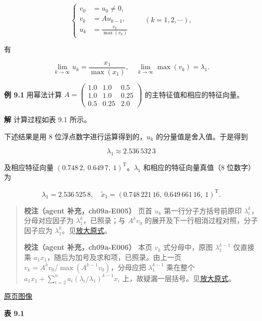 \documentclass[
  10pt,
  fontset=fandol]{ctexart}
\begin{document}
\[
\left\{
\begin{aligned}
v_0&=u_0\ne0,\\
v_k&=Au_{k-1},\\
u_k&=\frac{v_k}{\max(v_k)}
\end{aligned}
\right.\qquad(k=1,2,\cdots),
\tag{9.2.9}
\]

有

\[
\lim_{k\to\infty}u_k=\frac{x_1}{\max(x_1)},\quad\lim_{k\to\infty}\max(v_k)=\lambda_1.
\]

\textbf{例 9.1} 用幂法计算 \(A=\begin{pmatrix}1.0&1.0&0.5\\1.0&1.0&0.25\\0.5&0.25&2.0\end{pmatrix}\) 的主特征值和相应的特征向量。

\textbf{解} 计算过程如表 9.1 所示。

下述结果是用 8 位浮点数字进行运算得到的，\(u_k\) 的分量值是舍入值。于是得到

\[
\lambda_1\approx2.536\,532\,3
\]

及相应特征向量 \((0.748\,2,\ 0.649\,7,\ 1)^{\mathrm T}\)。\(\lambda_1\) 和相应的特征向量真值（8 位数字）为

\[
\lambda_1=2.536\,525\,8,\quad\widetilde{x}_1=(0.748\,221\,16,\ 0.649\,661\,16,\ 1)^{\mathrm T}.
\]

\begin{quote}
\textbf{校注（agent 补充，ch09a-E005）} 页首 \(u_k\) 第一行分子方括号前原印 \(\lambda_i^k\)，分母对应因子为 \(\lambda_1^k\)，已照录；与 \(A^kv_0\) 的展开及下一行相消过程对照，分子因子应为 \(\lambda_1^k\)。见\href{../assets/ch09a/review-p237-u-k-numerator.png}{放大原式}。

\textbf{校注（agent 补充，ch09a-E006）} 本页 \(v_k\) 式分母中，原图 \(\lambda_1^{k-1}\) 仅直接乘 \(a_1x_1\)，随后为加号及求和项，已照录。由上一页 \(v_k=A^kv_0/\max(A^{k-1}v_0)\)，分母应把 \(\lambda_1^{k-1}\) 乘在整个 \(a_1x_1+\sum_{i=2}^na_i(\lambda_i/\lambda_1)^{k-1}x_i\) 上，故疑漏一层括号。见\href{../assets/ch09a/review-p237-v-k-denominator.png}{放大原式}。
\end{quote}

\href{../../source-images/pdf-238.jpeg}{原页图像}

\textbf{表 9.1}
\end{document}
